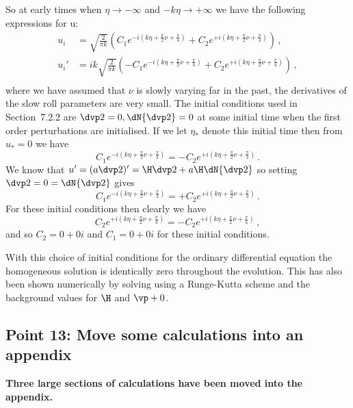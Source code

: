 So at early times when $\eta\rightarrow -\infty$ and $-k\eta\rightarrow +\infty$ we have the
following expressions for u:
% 
\begin{align}
 u_{i} &= \sqrt{\frac{2}{\pi k}}\left( C_1 e^{-i(k\eta +\frac{\pi}{2}\nu + \frac{\pi}{4})}
                + C_2 e^{+i(k\eta +\frac{\pi}{2}\nu + \frac{\pi}{4})} \right) \,,\\
 u_{i}' &= i k\sqrt{\frac{2}{\pi k}}\left( -C_1 e^{-i(k\eta +\frac{\pi}{2}\nu + \frac{\pi}{4})}
                + C_2 e^{+i(k\eta +\frac{\pi}{2}\nu + \frac{\pi}{4})} \right) \,,\\
\end{align}
% 
where we have assumed that $\nu$ is slowly varying far in the past, \iec the derivatives of the slow
roll parameters are very small. The initial conditions used in Section~7.2.2 are $\dvp2=0,
\dN{\dvp2}=0$ at some initial time when the first order perturbations are initialised. If we let
$\eta_*$ denote this initial time then from $u_*=0$ we have
% 
\begin{equation}
 C_1 e^{-i(k\eta +\frac{\pi}{2}\nu + \frac{\pi}{4})} = -C_2 e^{+i(k\eta +\frac{\pi}{2}\nu +
\frac{\pi}{4})}\,.
\end{equation}
% 
We know that $u'=(a\dvp2)' = \H \dvp2 + a\H \dN{\dvp2}$ so setting $\dvp2=0=\dN{\dvp2}$ gives
% 
\begin{equation}
 C_1 e^{-i(k\eta +\frac{\pi}{2}\nu + \frac{\pi}{4})} = +C_2 e^{+i(k\eta +\frac{\pi}{2}\nu +
\frac{\pi}{4})}\,.
\end{equation}
% 
For these initial conditions then clearly we have
% 
\begin{equation}
C_2 e^{+i(k\eta +\frac{\pi}{2}\nu + \frac{\pi}{4})} =
 -C_2 e^{+i(k\eta +\frac{\pi}{2}\nu + \frac{\pi}{4})} \,,
\end{equation}
% 
and so $C_2 = 0 + 0i$ and $C_1=0+0i$ for these initial conditions.

With this choice of initial conditions for the ordinary differential equation the homogeneous
solution is identically zero throughout the evolution. This has also been shown numerically by
solving  using a Runge-Kutta scheme and the background values for
$\H$ and $\vp+0$.


%  


\subsection{Point 13: Move some calculations into an appendix}
\textbf{Three large sections of calculations have been moved into the appendix.}

